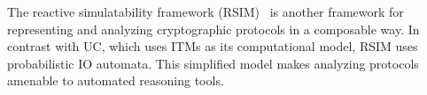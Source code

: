 The reactive simulatability framework (RSIM)~\cite{backes2007reactive} is
another framework for representing and analyzing cryptographic protocols in a
composable way. In contrast with UC, which uses ITMs as its computational model,
RSIM uses probabilistic IO automata. This simplified model makes analyzing
protocols amenable to automated reasoning tools.


\begin{comment}
\begin{enumerate}[leftmargin=*]
  \item Symbolic UC~\cite{bohl2016symbolic} transports ideas from the UC
    framework to the symbolic model of cryptography, in which cryptographic
    operations are abstracted as a term process algebra (specifically, a variant
    of the applied $\pi$-calculus) and adversary capabilities are defined by
    deduction rules over these terms. In particular, they show that certain
    aspects of the UC framework, such as ideal functionality specifications and
    UC composition, still carry over to the symbolic model. They are also able
    to show that certain results, such as the impossibility of UC commitments in
    the standard model of cryptography, can still be observed in the symbolic
    model. Although this abstract vantage point leads to simpler security proofs
    that can be amenable to automated reasoning, security guarantees derived
    from symbolic analyses are not as strong as those from computational
    analyses considered in UC and in cryptography more broadly.
  \item RSIM~\cite{backes2007reactive}.
  \item CertiCrypt~\cite{barthe2009formal} is a framework (built on
    Coq~\cite{barras1997coq}) that supports machine-checked game-based proofs of
    security. It includes tools to reason about the equivalence of probabilistic
    programs, a relational Hoare logic, a theory of observational equivalence,
    verified program transformations, and game-based techniques.  Their
    experience shows that the type system and automated tactics provide valuable
    information in debugging proofs.
  \item EasyCrypt~\cite{barthe2011computer} is follow-up work on CertiCrypt,
    which permits more automation and shorter proof scripts. \todo{Details on
      their imperative language?}
  \item ProVerif~\cite{blanchet2010proverif} is a tool for symbolically

\end{comment}
